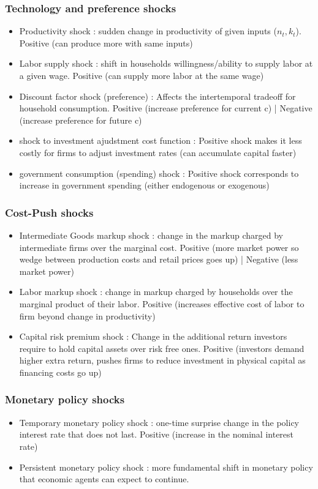 \documentclass{article}
\begin{document}
\subsubsection{Technology and preference shocks}
\begin{itemize}
    \item Productivity shock : sudden change in productivity of given inputs ($n_t,k_t$). Positive (can produce more with same inputs)
    \item Labor supply shock : shift in households willingness/ability to supply labor at a given wage. Positive (can supply more labor at the same wage)
    \item Discount factor shock (preference) : Affects the intertemporal tradeoff for household consumption. Positive (increase preference for current c) | Negative (increase preference for future c)
    \item shock to investment ajudstment cost function : Positive shock makes it less costly for firms to adjust investment rates (can accumulate capital faster)
    \item government consumption (spending) shock : Positive shock corresponds to increase in government spending (either endogenous or exogenous)
\end{itemize}
\subsubsection{Cost-Push shocks}
\begin{itemize}
    \item Intermediate Goods markup shock : change in the markup charged by intermediate firms over the marginal cost. Positive (more market power so wedge between production costs and retail prices goes up) | Negative (less market power)
    \item Labor markup shock : change in markup charged by households over the marginal product of their labor. Positive (increases effective cost of labor to firm beyond change in productivity)
    \item Capital risk premium shock : Change in the additional return investors require to hold capital assets over risk free ones. Positive (investors demand higher extra return, pushes firms to reduce investment in physical capital as financing costs go up)
\end{itemize}
\subsubsection{Monetary policy shocks}
\begin{itemize}
    \item Temporary monetary policy shock : one-time surprise change in the policy interest rate that does not last. Positive (increase in the nominal interest rate)
    \item Persistent monetary policy shock : more fundamental shift in monetary policy that economic agents can expect to continue. 
\end{itemize}
\end{document}
